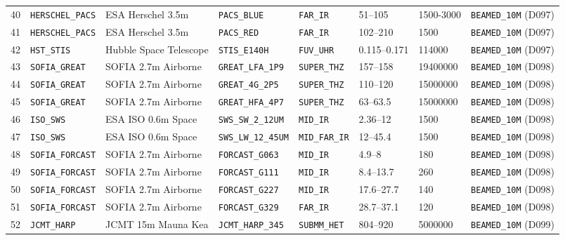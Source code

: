 \documentclass[twocolumn,10pt]{article}
\begin{document}
\begin{table}[!ht]
{\begin{tabular}{rlllllll}
40 & \texttt{HERSCHEL\_PACS} & ESA Herschel 3.5m & \texttt{PACS\_BLUE} & \texttt{FAR\_IR} & 51--105 & 1500-3000 & \texttt{BEAMED\_10M} (D097) \\
41 & \texttt{HERSCHEL\_PACS} & ESA Herschel 3.5m & \texttt{PACS\_RED} & \texttt{FAR\_IR} & 102--210 & 1500 & \texttt{BEAMED\_10M} (D097) \\
42 & \texttt{HST\_STIS} & Hubble Space Telescope & \texttt{STIS\_E140H} & \texttt{FUV\_UHR} & 0.115--0.171 & 114000 & \texttt{BEAMED\_10M} (D097) \\
43 & \texttt{SOFIA\_GREAT} & SOFIA 2.7m Airborne & \texttt{GREAT\_LFA\_1P9} & \texttt{SUPER\_THZ} & 157--158 & 19400000 & \texttt{BEAMED\_10M} (D098) \\
44 & \texttt{SOFIA\_GREAT} & SOFIA 2.7m Airborne & \texttt{GREAT\_4G\_2P5} & \texttt{SUPER\_THZ} & 110--120 & 15000000 & \texttt{BEAMED\_10M} (D098) \\
45 & \texttt{SOFIA\_GREAT} & SOFIA 2.7m Airborne & \texttt{GREAT\_HFA\_4P7} & \texttt{SUPER\_THZ} & 63--63.5 & 15000000 & \texttt{BEAMED\_10M} (D098) \\
46 & \texttt{ISO\_SWS} & ESA ISO 0.6m Space & \texttt{SWS\_SW\_2\_12UM} & \texttt{MID\_IR} & 2.36--12 & 1500 & \texttt{BEAMED\_10M} (D098) \\
47 & \texttt{ISO\_SWS} & ESA ISO 0.6m Space & \texttt{SWS\_LW\_12\_45UM} & \texttt{MID\_FAR\_IR} & 12--45.4 & 1500 & \texttt{BEAMED\_10M} (D098) \\
48 & \texttt{SOFIA\_FORCAST} & SOFIA 2.7m Airborne & \texttt{FORCAST\_G063} & \texttt{MID\_IR} & 4.9--8 & 180 & \texttt{BEAMED\_10M} (D098) \\
49 & \texttt{SOFIA\_FORCAST} & SOFIA 2.7m Airborne & \texttt{FORCAST\_G111} & \texttt{MID\_IR} & 8.4--13.7 & 260 & \texttt{BEAMED\_10M} (D098) \\
50 & \texttt{SOFIA\_FORCAST} & SOFIA 2.7m Airborne & \texttt{FORCAST\_G227} & \texttt{MID\_IR} & 17.6--27.7 & 140 & \texttt{BEAMED\_10M} (D098) \\
51 & \texttt{SOFIA\_FORCAST} & SOFIA 2.7m Airborne & \texttt{FORCAST\_G329} & \texttt{FAR\_IR} & 28.7--37.1 & 120 & \texttt{BEAMED\_10M} (D098) \\
52 & \texttt{JCMT\_HARP} & JCMT 15m Mauna Kea & \texttt{JCMT\_HARP\_345} & \texttt{SUBMM\_HET} & 804--920 & 5000000 & \texttt{BEAMED\_10M} (D099) \\
\bottomrule
\end{tabular}%
}
\end{table}
\end{document}
